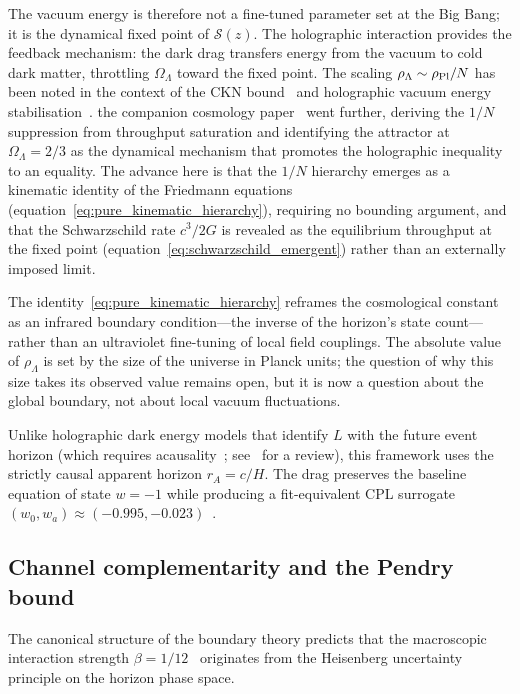 \documentclass[aps,prd,twocolumn,10pt,superscriptaddress,nofootinbib]{revtex4-2}
\begin{document}
The vacuum energy is therefore not a fine-tuned parameter set at
the Big Bang; it is the dynamical fixed point of
$\mathcal{S}(z)$.  The holographic
interaction provides the feedback mechanism: the dark drag
transfers energy from the vacuum to cold dark matter, throttling
$\Omega_\Lambda$ toward the fixed point.  The scaling $\rho_\Lambda \sim \rho_{\rm Pl}/N$ has been noted
in the context of the CKN bound~\cite{CKN1999} and holographic
vacuum energy stabilisation~\cite{Thomas2000}.
the companion cosmology paper~\cite{Sayegh2026} went further, deriving the $1/N$
suppression from throughput saturation and identifying the
attractor at $\Omega_\Lambda = 2/3$ as the dynamical mechanism
that promotes the holographic inequality to an equality.  The
advance here is that the $1/N$ hierarchy emerges as a kinematic
identity of the Friedmann equations
(equation~\ref{eq:pure_kinematic_hierarchy}), requiring no
bounding argument, and that the Schwarzschild rate $c^3/2G$ is
revealed as the equilibrium throughput at the fixed point
(equation~\ref{eq:schwarzschild_emergent}) rather than an
externally imposed limit.

The identity~\eqref{eq:pure_kinematic_hierarchy} reframes the
cosmological constant as an infrared boundary condition---the
inverse of the horizon's state count---rather than an ultraviolet
fine-tuning of local field couplings.  The absolute value of
$\rho_\Lambda$ is set by the size of the universe in Planck
units; the question of why this size takes its observed value
remains open, but it is now a question about the global boundary,
not about local vacuum fluctuations.

Unlike holographic dark energy models that identify $L$ with the
future event horizon (which requires
acausality~\cite{Hsu2004,Li2004}; see~\cite{WangWangLi2017} for a review), this framework uses the
strictly causal apparent horizon $r_A = c/H$.  The drag preserves
the baseline equation of state $w = -1$ while producing a
fit-equivalent CPL surrogate
$(w_0, w_a) \approx (-0.995, -0.023)$~\cite{Sayegh2026}.


\subsection{Channel complementarity and the Pendry bound}
\label{sec:pendry}

The canonical structure of the boundary theory predicts that the
macroscopic interaction strength
$\beta = 1/12$~\cite{Sayegh2026} originates from the Heisenberg
uncertainty principle on the horizon phase space.
\end{document}
